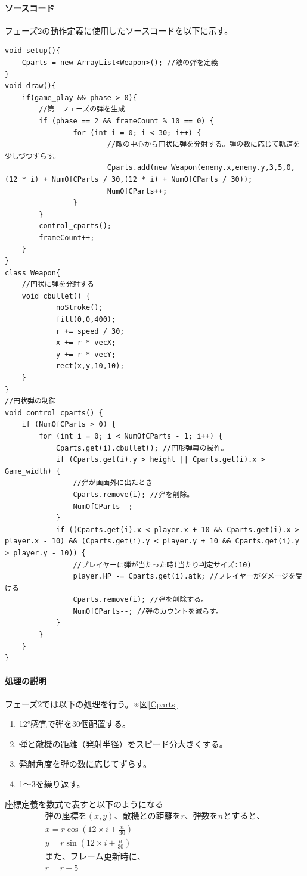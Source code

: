 \documentclass[a4paper,titlepage,11pt]{ltjsarticle}
\begin{document}
\paragraph{ソースコード}
フェーズ2の動作定義に使用したソースコードを以下に示す。
\begin{lstlisting}
void setup(){
	Cparts = new ArrayList<Weapon>(); //敵の弾を定義
}
void draw(){
	if(game_play && phase > 0){
		//第二フェーズの弾を生成
		if (phase == 2 && frameCount % 10 == 0) {
				for (int i = 0; i < 30; i++) {
						//敵の中心から円状に弾を発射する。弾の数に応じて軌道を少しづつずらす。
						Cparts.add(new Weapon(enemy.x,enemy.y,3,5,0,(12 * i) + NumOfCParts / 30,(12 * i) + NumOfCParts / 30));
						NumOfCParts++;
				}
		}
		control_cparts();
		frameCount++;
	}
}
class Weapon{
	//円状に弾を発射する
	void cbullet() {
			noStroke();
			fill(0,0,400);
			r += speed / 30;
			x += r * vecX;
			y += r * vecY;
			rect(x,y,10,10);
	}
}
//円状弾の制御
void control_cparts() {
    if (NumOfCParts > 0) {
        for (int i = 0; i < NumOfCParts - 1; i++) {
            Cparts.get(i).cbullet(); //円形弾幕の操作。
            if (Cparts.get(i).y > height || Cparts.get(i).x > Game_width) {
                //弾が画面外に出たとき
                Cparts.remove(i); //弾を削除。
                NumOfCParts--;
            }
            if ((Cparts.get(i).x < player.x + 10 && Cparts.get(i).x > player.x - 10) && (Cparts.get(i).y < player.y + 10 && Cparts.get(i).y > player.y - 10)) {
                //プレイヤーに弾が当たった時(当たり判定サイズ:10)
                player.HP -= Cparts.get(i).atk; //プレイヤーがダメージを受ける
                Cparts.remove(i); //弾を削除する。
                NumOfCParts--; //弾のカウントを減らす。
            }
        }
    }
}
\end{lstlisting}
\paragraph{処理の説明}
フェーズ2では以下の処理を行う。※図\ref{Cparts}
\begin{enumerate}
	\item 12°感覚で弾を30個配置する。
	\item 弾と敵機の距離（発射半径）をスピード分大きくする。
	\item 発射角度を弾の数に応じてずらす。
	\item 1～3を繰り返す。
\end{enumerate}
座標定義を数式で表すと以下のようになる
\begin{gather*}
	弾の座標を(x,y)、敵機との距離をr、弾数をnとすると、\\
	x = r\cos(12 \times i + \frac{n}{30}) \\
	y = r\sin(12 \times i + \frac{n}{30}) \\
	また、フレーム更新時に、 \\ 
	r = r + 5\\ 
\end{gather*}
\end{document}
